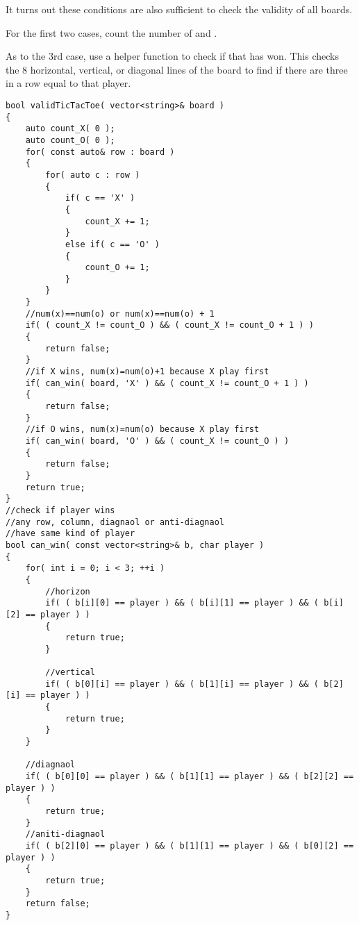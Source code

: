 It turns out these conditions are also sufficient to check the validity of all boards. 

For the first two cases, count the number of  and .

As to the 3rd case, use a helper function  to check if that  has won. This checks the 8 horizontal, vertical, or diagonal lines of the board to find if there are three in a row equal to that player.


\setcounter{lstlisting}{0}
\begin{lstlisting}[style=customc, caption={Ad Hoc}]
bool validTicTacToe( vector<string>& board )
{
    auto count_X( 0 );
    auto count_O( 0 );
    for( const auto& row : board )
    {
        for( auto c : row )
        {
            if( c == 'X' )
            {
                count_X += 1;
            }
            else if( c == 'O' )
            {
                count_O += 1;
            }
        }
    }
    //num(x)==num(o) or num(x)==num(o) + 1
    if( ( count_X != count_O ) && ( count_X != count_O + 1 ) )
    {
        return false;
    }
    //if X wins, num(x)=num(o)+1 because X play first
    if( can_win( board, 'X' ) && ( count_X != count_O + 1 ) )
    {
        return false;
    }
    //if O wins, num(x)=num(o) because X play first
    if( can_win( board, 'O' ) && ( count_X != count_O ) )
    {
        return false;
    }
    return true;
}
//check if player wins
//any row, column, diagnaol or anti-diagnaol
//have same kind of player
bool can_win( const vector<string>& b, char player )
{
    for( int i = 0; i < 3; ++i )
    {
        //horizon
        if( ( b[i][0] == player ) && ( b[i][1] == player ) && ( b[i][2] == player ) )
        {
            return true;
        }

        //vertical
        if( ( b[0][i] == player ) && ( b[1][i] == player ) && ( b[2][i] == player ) )
        {
            return true;
        }
    }

    //diagnaol
    if( ( b[0][0] == player ) && ( b[1][1] == player ) && ( b[2][2] == player ) )
    {
        return true;
    }
    //aniti-diagnaol
    if( ( b[2][0] == player ) && ( b[1][1] == player ) && ( b[0][2] == player ) )
    {
        return true;
    }
    return false;
}
\end{lstlisting}